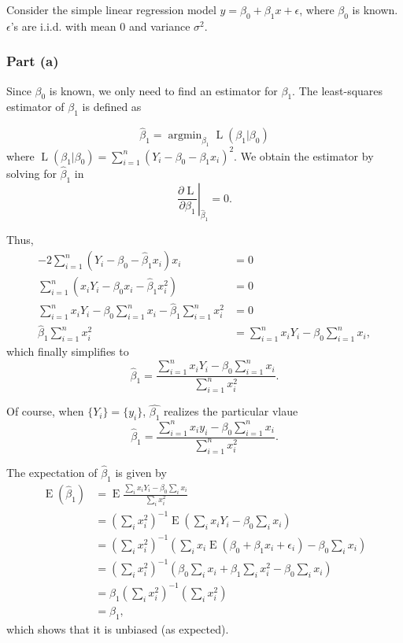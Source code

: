 \documentclass[
]{article}
\begin{document}
Consider the simple linear regression model
\(y = \beta_0 + \beta_1 x + \epsilon\), where \(\beta_0\) is known.
\(\epsilon\)'s are i.i.d. with mean \(0\) and variance \(\sigma^2\).

\hypertarget{part-a-2}{%
\subsubsection{Part (a)}\label{part-a-2}}


Since \(\beta_0\) is known, we only need to find an estimator for
\(\beta_1\). The least-squares estimator of \(\beta_1\) is defined as

\[
   \hat\beta_1 = {\mathop{\mathrm{argmin}}\limits}_{\beta_1} \operatorname{L}(\beta_1 | \beta_0)
\] where
\(\operatorname{L}(\beta_1 | \beta_0) = \sum_{i=1}^n \left(Y_i - \beta_0 - \beta_1 x_i\right)^2\).
We obtain the estimator by solving for \(\hat\beta_1\) in \[
   \left. \frac{\partial \operatorname{L}}{\partial \beta_1} \right\vert_{\hat\beta_1} = 0.
\]

Thus, \begin{align*}
         -2 \sum_{i=1}^n (Y_i - \beta_0 - \hat\beta_1 x_i)x_i &= 0\\
         \sum_{i=1}^n \left(x_i Y_i - \beta_0 x_i - \hat\beta_1 x_i^2\right) &= 0\\
         \sum_{i=1}^n x_i Y_i - \beta_0 \sum_{i=1}^n x_i - \hat\beta_1 \sum_{i=1}^n x_i^2 &= 0\\
         \hat\beta_1 \sum_{i=1}^n x_i^2  &= \sum_{i=1}^n x_i Y_i - \beta_0 \sum_{i=1}^n x_i,
\end{align*} which finally simplifies to \[
   \hat\beta_1 = \frac{\sum_{i=1}^n x_i Y_i - \beta_0 \sum_{i=1}^n x_i}{\sum_{i=1}^n x_i^2}.
\]

Of course, when \(\{Y_i\} = \{y_i\}\), \(\hat{\beta_1}\) realizes the
particular vlaue \[
   \hat\beta_1 = \frac{\sum_{i=1}^n x_i y_i - \beta_0 \sum_{i=1}^n x_i}{\sum_{i=1}^n x_i^2}.
\]

The expectation of \(\hat\beta_1\) is given by \begin{align*}
   \operatorname{E}(\hat\beta_1)
      &= \operatorname{E}{\frac{\sum_i x_i Y_i - \beta_0 \sum_i x_i}{\sum_i x_i^2}}\\
      &= \left(\sum_i x_i^2\right)^{-1}\operatorname{E}\left(\sum_i x_i Y_i - \beta_0 \sum_i x_i\right)\\
      &= \left(\sum_i x_i^2\right)^{-1}\left(\sum_i x_i \operatorname{E}(\beta_0 + \beta_1 x_i + \epsilon_i) - \beta_0 \sum_i x_i\right)\\
      &= \left(\sum_i x_i^2\right)^{-1}\left(\beta_0 \sum_i x_i + \beta_1 \sum_i x_i^2 - \beta_0 \sum_i x_i\right)\\
      &= \beta_1 \left(\sum_i x_i^2\right)^{-1}\left(\sum_i x_i^2\right)\\
      &= \beta_1,
\end{align*} which shows that it is unbiased (as expected).
\end{document}
